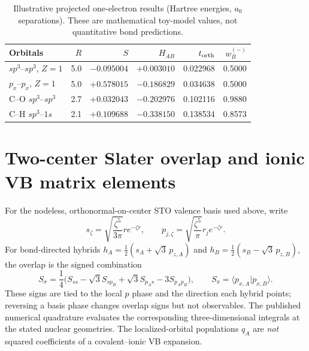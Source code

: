\documentclass[11pt,letterpaper]{article}
\begin{document}
\begin{table}[htbp]\centering\small
\caption{Illustrative projected one-electron results (Hartree energies, $a_0$ separations). These are mathematical toy-model values, not quantitative bond predictions.}
\begin{tabular}{lrrrrr}
\toprule
Orbitals & $R$ & $S$ & $H_{AB}$ & $t_{\rm orth}$ & $w_B^{(-)}$\\\midrule
$sp^3$--$sp^3$, $Z=1$ & 5.0 & $-0.095004$ & $+0.003010$ & 0.022968 & 0.5000\\
$p_x$--$p_x$, $Z=1$ & 5.0 & $+0.578015$ & $-0.186829$ & 0.034638 & 0.5000\\
C--O $sp^3$--$sp^3$ & 2.7 & $+0.032043$ & $-0.202976$ & 0.102116 & 0.9880\\
C--H $sp^3$--$1s$ & 2.1 & $+0.109688$ & $-0.338150$ & 0.138534 & 0.8573\\
\bottomrule
\end{tabular}
\end{table}

\section{Two-center Slater overlap and ionic VB matrix elements}\label{app:sto}
For the nodeless, orthonormal-on-center STO valence basis used above, write
\begin{equation}
 s_{\zeta}=\sqrt{\frac{\zeta^5}{3\pi}}r e^{-\zeta r},\qquad
 p_{j,\zeta}=\sqrt{\frac{\zeta^5}{\pi}}r_j e^{-\zeta r}.
\end{equation}
For bond-directed hybrids $h_A=\frac12(s_A+\sqrt3\,p_{z,A})$ and
$h_B=\frac12(s_B-\sqrt3\,p_{z,B})$, the overlap is the signed combination
\begin{equation}
 S_\sigma=\frac14\bigl(S_{ss}-\sqrt3 S_{s p_B}+\sqrt3 S_{p_A s}-3S_{p_A p_B}\bigr),
 \qquad S_{\pi}=\langle p_{x,A}|p_{x,B}\rangle.
\end{equation}
These signs are tied to the local $p$ phase and the direction each hybrid points; reversing a basis phase changes overlap signs but not observables. The published numerical quadrature evaluates the corresponding three-dimensional integrals at the stated nuclear geometries. The localized-orbital populations $q_A$ are \emph{not} squared coefficients of a covalent--ionic VB expansion.
\end{document}
